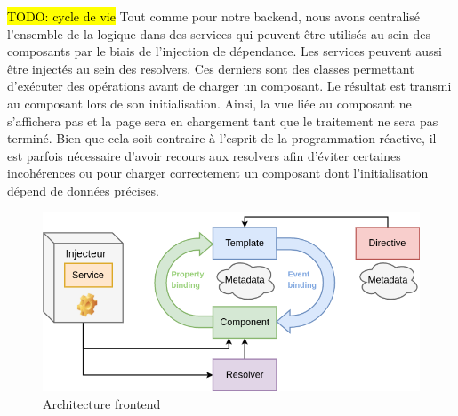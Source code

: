 	\hl{TODO: cycle de vie} Tout comme pour notre backend, nous avons centralisé l'ensemble de la logique dans des services qui peuvent être utilisés au sein des composants par le biais de l'injection de dépendance. Les services peuvent aussi être injectés au sein des resolvers. Ces derniers sont des classes permettant d'exécuter des opérations avant de charger un composant. Le résultat est transmi au composant lors de son initialisation. Ainsi, la vue liée au composant ne s'affichera pas et la page sera en chargement tant que le traitement ne sera pas terminé. Bien que cela soit contraire à l'esprit de la programmation réactive, il est parfois nécessaire d'avoir recours aux resolvers afin d'éviter certaines incohérences ou pour charger correctement un composant dont l'initialisation dépend de données précises.

\begin{figure}[h!]
	\includegraphics[scale=0.50]{images/travailBP1818/architecture/angularArchi.png}
	\centering
	\caption{Architecture frontend}
	\label{angularArchi}
\end{figure}